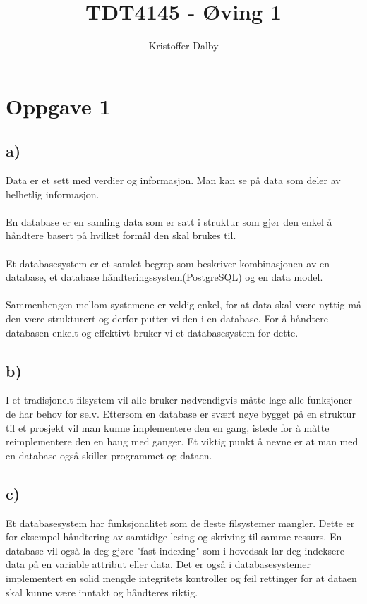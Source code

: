 \documentclass[a4paper, 10pt]{article}
\title{TDT4145 - Øving 1}
\author{Kristoffer Dalby}
\date{}
\begin{document}
\maketitle

\thispagestyle{empty}
\newpage
{}
\setcounter{page}{1}

\section*{Oppgave 1}
\subsection*{a)}
Data er et sett med verdier og informasjon. Man kan se på data som deler av helhetlig informasjon.\\\\
En database er en samling data som er satt i struktur som gjør den enkel å håndtere basert på hvilket formål den skal brukes til.\\\\
Et databasesystem er et samlet begrep som beskriver kombinasjonen av en database, et database håndteringssystem(PostgreSQL) og en data model.\\\\
Sammenhengen mellom systemene er veldig enkel, for at data skal være nyttig må den være strukturert og derfor putter vi den i en database. For å håndtere databasen enkelt og effektivt bruker vi et databasesystem for dette.

\subsection*{b)}
I et tradisjonelt filsystem vil alle bruker nødvendigvis måtte lage alle funksjoner de har behov for selv. Ettersom en database er svært nøye bygget på en struktur til et prosjekt vil man kunne implementere den en gang, istede for å måtte reimplementere den en haug med ganger. Et viktig punkt å nevne er at man med en database også skiller programmet og dataen.

\subsection*{c)}
Et databasesystem har funksjonalitet som de fleste filsystemer mangler. Dette er for eksempel håndtering av samtidige lesing og skriving til samme ressurs. En database vil også la deg gjøre "fast indexing" som i hovedsak lar deg indeksere data på en variable attribut eller data. Det er også i databasesystemer implementert en solid mengde integritets kontroller og feil rettinger for at dataen skal kunne være inntakt og håndteres riktig.
\end{document}
